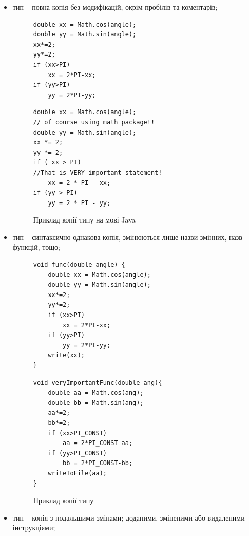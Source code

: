 \documentclass[a4paper, 14pt]{article}
\newcommand{\RNum}[1]{\uppercase\expandafter{\romannumeral #1\relax}}
\begin{document}
\begin{itemize}
\item \RNum{1} тип -- повна копія без модифікацій, окрім пробілів та коментарів;
\begin{figure}[!htb]
\centering
\begin{minipage}[t]{.45\textwidth}
\begin{lstlisting}[frame=none]
double xx = Math.cos(angle);
double yy = Math.sin(angle);
xx*=2;
yy*=2;	
if (xx>PI)
	xx = 2*PI-xx;
if (yy>PI)
	yy = 2*PI-yy;
\end{lstlisting}
\end{minipage}
\begin{minipage}[t]{.45\textwidth}
\begin{lstlisting}[frame=none]
double xx = Math.cos(angle);
// of course using math package!!
double yy = Math.sin(angle);
xx *= 2;
yy *= 2;	
if ( xx > PI)
//That is VERY important statement!
	xx = 2 * PI - xx; 
if (yy > PI)
	yy = 2 * PI - yy;
\end{lstlisting}
\end{minipage}
\caption*{Приклад копії \RNum{1} типу на мові Java}
\end{figure}
\item \RNum{2} тип -- синтаксично однакова копія, змінюються лише назви змінних, назв функцій, тощо;
\begin{figure}[!htb]
\centering
\begin{minipage}[t]{.45\textwidth}
\begin{lstlisting}[frame=none]
void func(double angle) {
	double xx = Math.cos(angle);
	double yy = Math.sin(angle);
	xx*=2;
	yy*=2;	
	if (xx>PI)
		xx = 2*PI-xx;
	if (yy>PI)
		yy = 2*PI-yy;
	write(xx);
}
\end{lstlisting}
\end{minipage}
\begin{minipage}[t]{.45\textwidth}
\begin{lstlisting}[frame=none]
void veryImportantFunc(double ang){
	double aa = Math.cos(ang);
	double bb = Math.sin(ang);
	aa*=2;
	bb*=2;	
	if (xx>PI_CONST)
		aa = 2*PI_CONST-aa;
	if (yy>PI_CONST)
		bb = 2*PI_CONST-bb;
	writeToFile(aa);
}
\end{lstlisting}
\end{minipage}
\caption*{Приклад копії \RNum{2} типу}
\end{figure}
\item \RNum{3} тип -- копія з подальшими змінами; доданими, зміненими або видаленими інструкціями;
\begin{figure}

\end{figure}
\end{itemize}
\end{document}
